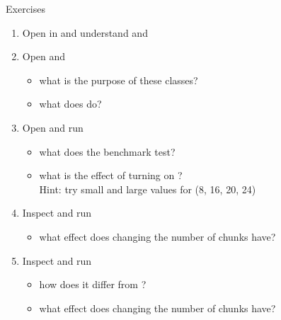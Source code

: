 \begin{frame}[fragile]{Exercises}
    \begin{enumerate}
        \item Open  in  and understand  and 

        \item Open  and 
        \begin{itemize}
            \item what is the purpose of these classes?
            \item what does  do?
        \end{itemize}

        \item Open  and run
        \begin{itemize}
            \item what does the benchmark test?
            \item what is the effect of turning on ?\\Hint: try small and large values for  (8, 16, 20, 24)
        \end{itemize}

        \item Inspect  and run
        \begin{itemize}
            \item what effect does changing the number of chunks have?
        \end{itemize}

        \item Inspect  and run
        \begin{itemize}
            \item how does it differ from ?
            \item what effect does changing the number of chunks have?
        \end{itemize}
    \end{enumerate}
\end{frame}

